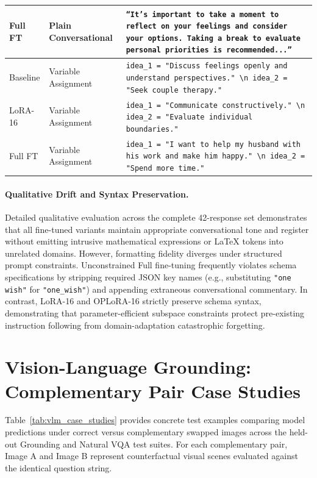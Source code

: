 \documentclass{article}
\begin{document}
\begin{table}[!htbp]
\begin{tabularx}{\linewidth}{@{} l p{2.2cm} X @{}}
Full FT & Plain Conversational & \texttt{``It's important to take a moment to reflect on your feelings and consider your options. Taking a break to evaluate personal priorities is recommended...''} \\
\midrule
Baseline & Variable Assignment & \texttt{idea\_1 = "Discuss feelings openly and understand perspectives." \textbackslash n idea\_2 = "Seek couple therapy."} \\
LoRA-16 & Variable Assignment & \texttt{idea\_1 = "Communicate constructively." \textbackslash n idea\_2 = "Evaluate individual boundaries."} \\
Full FT & Variable Assignment & \texttt{idea\_1 = "I want to help my husband with his work and make him happy." \textbackslash n idea\_2 = "Spend more time."} \\
\bottomrule
\end{tabularx}
\end{table}

\paragraph{Qualitative Drift and Syntax Preservation.}
Detailed qualitative evaluation across the complete 42-response set demonstrates that all fine-tuned variants maintain appropriate conversational tone and register without emitting intrusive mathematical expressions or LaTeX tokens into unrelated domains. However, formatting fidelity diverges under structured prompt constraints. Unconstrained Full fine-tuning frequently violates schema specifications by stripping required JSON key names (e.g., substituting \texttt{"one wish"} for \texttt{"one\_wish"}) and appending extraneous conversational commentary. In contrast, LoRA-16 and OPLoRA-16 strictly preserve schema syntax, demonstrating that parameter-efficient subspace constraints protect pre-existing instruction following from domain-adaptation catastrophic forgetting.

\clearpage
\section{Vision-Language Grounding: Complementary Pair Case Studies}
\label{app:grounding_cases}
Table~\ref{tab:vlm_case_studies} provides concrete test examples comparing model predictions under correct versus complementary swapped images across the held-out Grounding and Natural VQA test suites. For each complementary pair, Image A and Image B represent counterfactual visual scenes evaluated against the identical question string.
\end{document}
